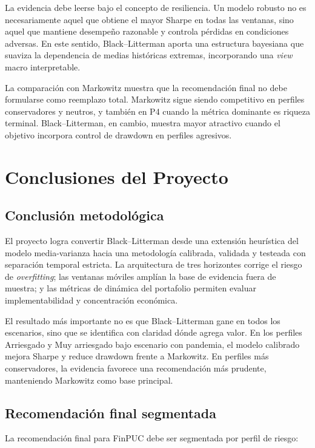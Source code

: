 \documentclass[11pt]{article}
\begin{document}
La evidencia debe leerse bajo el concepto de resiliencia. Un modelo robusto no es necesariamente aquel que obtiene el mayor Sharpe en todas las ventanas, sino aquel que mantiene desempe\~no razonable y controla p\'erdidas en condiciones adversas. En este sentido, Black--Litterman aporta una estructura bayesiana que suaviza la dependencia de medias hist\'oricas extremas, incorporando una \textit{view} macro interpretable.

La comparaci\'on con Markowitz muestra que la recomendaci\'on final no debe formularse como reemplazo total. Markowitz sigue siendo competitivo en perfiles conservadores y neutros, y tambi\'en en P4 cuando la m\'etrica dominante es riqueza terminal. Black--Litterman, en cambio, muestra mayor atractivo cuando el objetivo incorpora control de drawdown en perfiles agresivos.

\section{Conclusiones del Proyecto}

\subsection{Conclusi\'on metodol\'ogica}

El proyecto logra convertir Black--Litterman desde una extensi\'on heur\'istica del modelo media-varianza hacia una metodolog\'ia calibrada, validada y testeada con separaci\'on temporal estricta. La arquitectura de tres horizontes corrige el riesgo de \textit{overfitting}; las ventanas m\'oviles ampl\'ian la base de evidencia fuera de muestra; y las m\'etricas de din\'amica del portafolio permiten evaluar implementabilidad y concentraci\'on econ\'omica.

El resultado m\'as importante no es que Black--Litterman gane en todos los escenarios, sino que se identifica con claridad d\'onde agrega valor. En los perfiles Arriesgado y Muy arriesgado bajo escenario con pandemia, el modelo calibrado mejora Sharpe y reduce drawdown frente a Markowitz. En perfiles m\'as conservadores, la evidencia favorece una recomendaci\'on m\'as prudente, manteniendo Markowitz como base principal.

\subsection{Recomendaci\'on final segmentada}

La recomendaci\'on final para FinPUC debe ser segmentada por perfil de riesgo:
\end{document}
